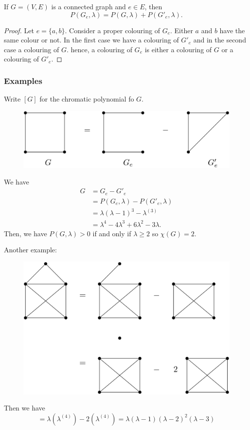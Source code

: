 \documentclass[11pt]{article}
\begin{document}
    If \(G = (V,E)\) is a connected graph and \(e \in E\), then \[P(G_e, \lambda) = P(G, \lambda) + P(G'_e, \lambda).\]

    \begin{proof}
        Let \(e = \{a,b\}\). Consider a proper colouring of \(G_e\). Either $a$ and $b$ have the same colour or not. In the first case we have a colouring of \(G'_e\) and in the second case a colouring of $G$. hence, a colouring of \(G_e\) is either a colouring of $G$ or a colouring of \(G'_e\). 
    \end{proof}

    \subsubsection{Examples}

    Write \([G]\) for the chromatic polynomial fo $G$. 
    \begin{figure}[H]
        \centering
        \includegraphics[scale=0.2]{decom1.png}
    \end{figure}
    We have
    \begin{align*}
        G &= G_e - G'_e \\
          &= P(G_e, \lambda) - P(G'_e,\lambda) \\
          &= \lambda (\lambda - 1)^3 - \lambda^{(3)} \\
          &= \lambda^4 - 4\lambda^3 + 6 \lambda^2 - 3\lambda.
    \end{align*}
    Then, we have \(P(G,\lambda) > 0\) if and only if \(\lambda \geq 2\) so \(\chi (G) = 2\). 
    
    \pagebreak

    Another example:
    \begin{figure}[H]
        \centering
        \includegraphics[scale=0.2]{decom2.png}
    \end{figure}
    Then we have \[= \lambda (\lambda^{(4)}) - 2(\lambda^{(4)}) = \lambda(\lambda - 1)(\lambda - 2)^2 (\lambda - 3)\]
\end{document}
